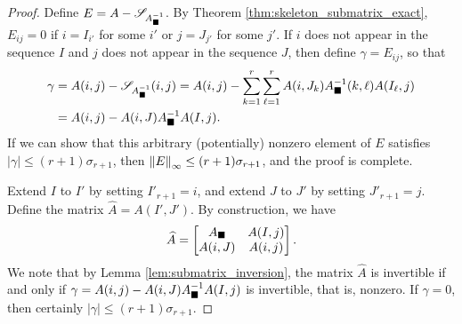 \documentclass{article}
\begin{document}
	\newcommand{\biggermat}{\widehat{A}}
	\begin{proof}
		Define $E = A - \mathscr{S}_{A_\blacksquare^{-1}}$. By Theorem \ref{thm:skeleton_submatrix_exact}, $E_{ij} = 0$ if $i =I_{i'}$ for some $i'$ or $j = J_{j'}$ for some $j'$. If $i$ does not appear in the sequence $I$ and $j$ does not appear in the sequence $J$, then define $\gamma = E_{ij}$, so that
		\begin{align}
			\gamma &= A(i,j) - \mathscr{S}_{A_\blacksquare^{-1}}(i,j) = A(i,j) - \sum_{k=1}^r\sum_{\ell=1}^rA(i,J_k)A_\blacksquare^{-1}(k,\ell)A(I_\ell,j) \\
			&= A(i,j) - A(i,J)A_\blacksquare^{-1}A(I,j).
		\end{align}
		If we can show that this arbitrary (potentially) nonzero element of $E$ satisfies $|\gamma| \le (r+1)\sigma_{r+1}$, then $\left\lVert E \right\rVert_\infty \le (r+1)\sigma_{r+1}$, and the proof is complete.
		
		Extend $I$ to $I'$ by setting $I'_{r+1} = i$, and extend $J$ to $J'$ by setting $J'_{r+1} = j$. Define the matrix $\biggermat = A(I',J')$. By construction, we have
		\begin{equation}
			\biggermat = \left[\begin{matrix}
				A_\msq &  A(I, j) \\
				A(i, J) & A(i,j)
			\end{matrix}\right].
		\end{equation}
		We note that by Lemma \ref{lem:submatrix_inversion}, the matrix $\biggermat$ is invertible if and only if $\gamma = A(i,j) - A(i,J)A_\blacksquare^{-1}A(I,j)$ is invertible, that is, nonzero. If $\gamma = 0$, then certainly $|\gamma| \le (r+1)\sigma_{r+1}$. 
		

\end{proof}
\end{document}
